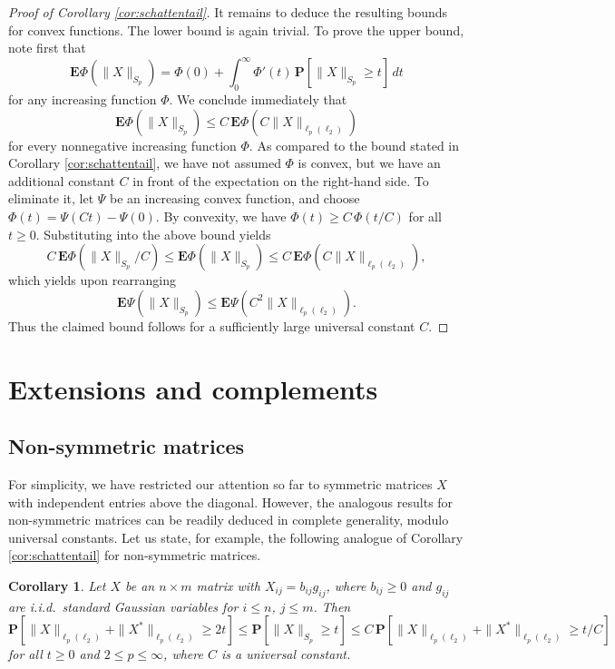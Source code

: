 \documentclass[10pt,reqno]{amsart}
\newtheorem{cor}[thm]{Corollary}
\theoremstyle{definition}
\numberwithin{equation}{section}
\numberwithin{figure}{section}
\numberwithin{table}{section}
\begin{document}
\begin{proof}[Proof of Corollary \ref{cor:schattentail}]
It remains to deduce the resulting bounds 
for convex functions. The lower bound is again trivial. To prove the upper 
bound, note first that
$$
	\mathbf{E}\Phi(\|X\|_{S_p}) =
	\Phi(0) + 
	\int_0^\infty \Phi'(t)\,
	\mathbf{P}[\|X\|_{S_p}\ge t]\,dt
$$
for any increasing function $\Phi$. We conclude immediately that
$$
	\mathbf{E}\Phi(\|X\|_{S_p}) \le
	C\,\mathbf{E}\Phi(C\|X\|_{\ell_p(\ell_2)})
$$
for every nonnegative increasing function $\Phi$. As compared to the bound 
stated in Corollary \ref{cor:schattentail}, we have not assumed $\Phi$ is 
convex, but we have an additional constant $C$ in front of the expectation 
on the right-hand side. To eliminate it, let $\Psi$ be an increasing 
convex function, and choose $\Phi(t) = \Psi(Ct)-\Psi(0)$. By convexity, we 
have $\Phi(t)\ge C\,\Phi(t/C)$ for all $t\ge 0$. Substituting into the 
above bound yields
$$
	C\, \mathbf{E}\Phi(\|X\|_{S_p}/C)
	\le
	\mathbf{E}\Phi(\|X\|_{S_p})
	\le
	C\, \mathbf{E}\Phi(C\|X\|_{\ell_p(\ell_2)}),
$$
which yields upon rearranging
$$
	\mathbf{E}\Psi(\|X\|_{S_p}) \le
	\mathbf{E}\Psi(C^2\|X\|_{\ell_p(\ell_2)}).
$$
Thus the claimed bound follows
for a sufficiently large universal constant $C$.
\end{proof}

\section{Extensions and complements}
\label{sec:ext}

\subsection{Non-symmetric matrices}
\label{sec:nonsym}

For simplicity, we have restricted our attention so far to symmetric matrices 
$X$ with independent entries above the diagonal. However, the analogous 
results for non-symmetric matrices can be readily deduced in complete 
generality, modulo universal constants. Let us state, for example, the 
following analogue of Corollary \ref{cor:schattentail} for non-symmetric 
matrices.

\begin{cor}
\label{cor:schattentailasym}
Let $X$ be an $n\times m$ matrix with
$X_{ij}=b_{ij}g_{ij}$, where $b_{ij}\ge 0$ and $g_{ij}$ are i.i.d.\
standard Gaussian variables for $i\le n$, $j\le m$. 
Then
$$
	\mathbf{P}[\|X\|_{\ell_p(\ell_2)}+
	\|X^*\|_{\ell_p(\ell_2)}\ge 2t] \le
	\mathbf{P}[\|X\|_{S_p}\ge t] \le
	C\,\mathbf{P}[\|X\|_{\ell_p(\ell_2)}
	+\|X^*\|_{\ell_p(\ell_2)}\ge t/C]
$$
for all $t\ge 0$ and $2\le p\le\infty$, where $C$ is a universal constant.
\end{cor}
\end{document}
